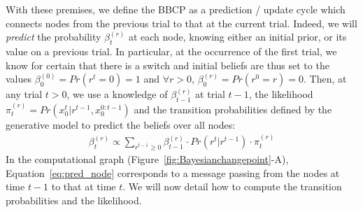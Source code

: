 \documentclass[12pt,english]{article}%
\newcommand{\eqa}[1]{\begin{align}#1\end{align}}
\newcommand{\seeFig}[1]{Figure~\ref{fig:#1}}
\newcommand{\seeEq}[1]{Equation~\ref{eq:#1}}
\begin{document}
With these premises, we define the BBCP
as a prediction / update cycle
which connects nodes from the previous trial to that at the current trial.
Indeed, we will \emph{predict} the probability
$\beta^{(r)}_t$ at each node, knowing either an initial prior, or its value on a previous trial.
In particular, at the occurrence of the first trial, we know for certain that there is a switch and
initial beliefs are thus set to the values $\beta^{(0)}_0=Pr(r^t=0)=1$ and
$\forall r>0$, $\beta^{(r)}_0=Pr(r^0=r)=0$.
Then, at any trial $t>0$, we use a knowledge of $\beta^{(r)}_{t-1}$ at trial $t-1$,
the likelihood $\pi^{(r)}_{t}=Pr(x_0^{t} | r^{t-1}, x_0^{0:t-1})$  and
the transition probabilities defined by the generative model
to predict the beliefs over all nodes: %
\eqa{
\beta^{(r)}_t \propto \sum_{r^{t-1} \geq 0} \beta^{(r)}_{t-1} \cdot Pr(r^t | r^{t-1}) \cdot  \pi^{(r)}_{t}  
\label{eq:pred_node}
}
In the computational graph (\seeFig{Bayesianchangepoint}-A), 
\seeEq{pred_node} corresponds to a message passing from the nodes at time $t-1$
to that at time $t$. %
We will now detail how to compute the transition probabilities and the likelihood.
\end{document}
